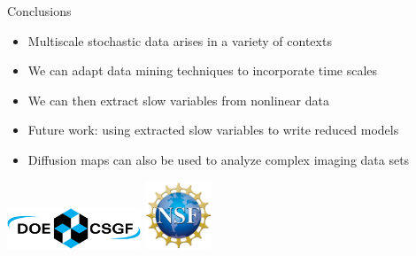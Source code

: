 \documentclass[12pt]{beamer}
\begin{document}
\begin{frame}{Conclusions}

\begin{itemize}
\item Multiscale stochastic data arises in a variety of contexts
\item We can adapt data mining techniques to incorporate time scales
\item We can then extract slow variables from nonlinear data
\item Future work: using extracted slow variables to write reduced models

\end{itemize}

\vspace{0.2cm}

\begin{itemize}
\item Diffusion maps can also be used to analyze complex imaging data sets
\end{itemize}

\vspace{1cm}
\centering
\includegraphics[width=4cm]{csgf_logo}
\hspace{2cm}
\includegraphics[width=2cm]{nsf_logo}

\end{frame}
\end{document}
